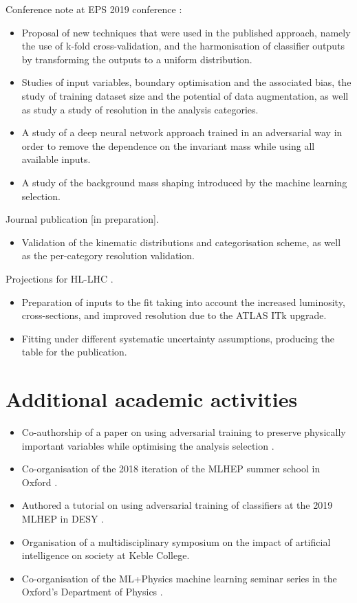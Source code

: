 \noindent Conference note at EPS 2019 conference \cite{ATLAS-CONF-2019-028}:
\begin{itemize}
\item Proposal of new techniques that were used in the
published approach, namely the use of k-fold cross-validation,
and the harmonisation of classifier outputs by transforming the
outputs to a uniform distribution.
\item Studies of input variables, boundary optimisation and the
associated bias, the study of training dataset size and the potential
of data augmentation, as well as study a study of resolution in
the analysis categories.
\item A study of a deep neural network approach trained in an
adversarial way in order to remove the dependence on the invariant
mass while using all available inputs.
\item A study of the background mass shaping introduced by the
machine learning selection.
\end{itemize}

\noindent Journal publication [in preparation].
\begin{itemize}
\item Validation of the kinematic distributions and categorisation
scheme, as well as the per-category resolution validation.
\end{itemize}

\noindent Projections for HL-LHC \cite{ATL-PHYS-PUB-2018-054, Cepeda:2019klc}.
\begin{itemize}
\item Preparation of inputs to the fit taking into account the increased
luminosity, cross-sections, and improved resolution due to the ATLAS
ITk upgrade.
\item Fitting under different systematic uncertainty assumptions,
producing the table for the publication.
\end{itemize}

\section*{Additional academic activities}

\begin{itemize}
\item Co-authorship of a paper on using adversarial training to preserve
physically important variables while optimising the analysis
selection \cite{Windischhofer:2019ltt}.
\item Co-organisation of the 2018 iteration of the MLHEP summer school
in Oxford \cite{MLHEP2018}.
\item Authored a tutorial on using adversarial training of classifiers
at the 2019 MLHEP in DESY \cite{MLHEP2019}.
\item Organisation of a multidisciplinary symposium on the impact of artificial
intelligence on society at Keble College.
\item Co-organisation of the ML+Physics machine learning seminar
series in the Oxford's Department of Physics \cite{ML+physics}.
\end{itemize}







